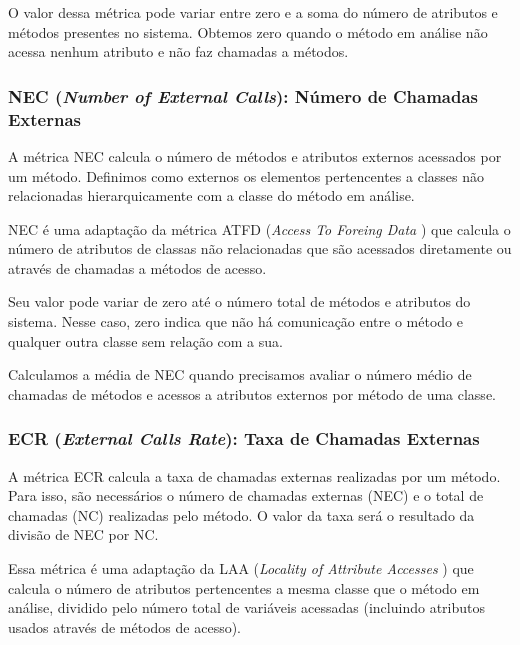 O valor dessa métrica pode variar entre zero e a soma do número de atributos e métodos presentes no sistema. Obtemos zero quando o método em análise não acessa nenhum atributo e não faz chamadas a métodos.
	

\subsubsection{NEC (\textit{Number of External Calls}): Número de Chamadas Externas}

A métrica NEC calcula o número de métodos e atributos externos acessados por um método. Definimos como externos os elementos pertencentes a classes não relacionadas hierarquicamente com a classe do método em análise.
 	                                               
NEC é uma adaptação da métrica ATFD (\textit{Access To Foreing Data} \citep{Marinescu02}) que calcula o número de atributos de classas não relacionadas que são acessados diretamente ou através de chamadas a métodos de acesso. 

Seu valor pode variar de zero até o número total de métodos e atributos do sistema. Nesse caso, zero indica que não há comunicação entre o método e qualquer outra classe sem relação com a sua.
	        
Calculamos a média de NEC quando precisamos avaliar o número médio de chamadas de métodos e acessos a atributos externos por método de uma classe. 
                                                                                                           
                          
\subsubsection{ECR (\textit{External Calls Rate}): Taxa de Chamadas Externas}
                                         
A métrica ECR calcula a taxa de chamadas externas realizadas por um método. Para isso, são necessários o número de chamadas externas (NEC) e o total de chamadas (NC) realizadas pelo método. O valor da taxa será o resultado da divisão de NEC por NC.

Essa métrica é uma adaptação da LAA (\textit{Locality of Attribute Accesses} \citep{Lanza06}) que calcula o número de atributos pertencentes a mesma classe que o método em análise, dividido pelo número total de variáveis acessadas (incluindo atributos usados através de métodos de acesso). 

